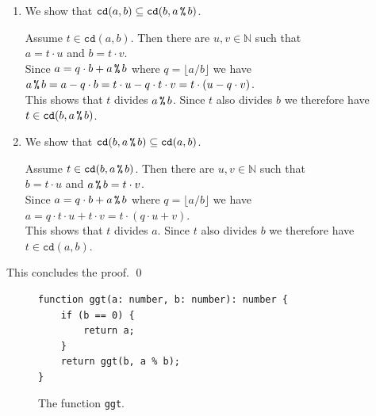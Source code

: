 \begin{enumerate}
\item We show that $\mathtt{cd}(a, b) \subseteq \mathtt{cd}(b, a \,\texttt{\%}\, b)$.

      Assume $t \in \mathtt{cd}(a, b)$.  Then there are $u, v \in \mathbb{N}$ such that
      \\[0.2cm]
      \hspace*{1.3cm}
      $a = t \cdot u$ \quad and \quad $b = t \cdot v$.
      \\[0.2cm]
      Since $a = q \cdot b + a \,\texttt{\%}\, b$ where $q = \lfloor a / b \rfloor$ we have
      \\[0.2cm]
      \hspace*{1.3cm}
      $a \,\texttt{\%}\, b = a - q \cdot b = t \cdot u - q \cdot t \cdot v = t \cdot (u - q \cdot v)$.
      \\[0.2cm]
      This shows that $t$ divides $a \,\texttt{\%}\, b$. Since $t$ also divides $b$ we therefore have
      $t \in \mathtt{cd}(b, a \,\texttt{\%}\, b)$. \green{$\surd$}
\item We show that $\mathtt{cd}(b, a \,\texttt{\%}\, b) \subseteq \mathtt{cd}(a, b)$.

      Assume $t \in \mathtt{cd}(b, a \,\texttt{\%}\, b)$.  Then there are $u, v \in \mathbb{N}$ such that
      \\[0.2cm]
      \hspace*{1.3cm}
      $b = t \cdot u$ \quad and \quad $a \,\texttt{\%}\, b = t \cdot v$.
      \\[0.2cm]
      Since $a = q \cdot b + a \,\texttt{\%}\, b$ where $q = \lfloor a / b \rfloor$ we have
      \\[0.2cm]
      \hspace*{1.3cm}
      $a = q \cdot t \cdot u + t \cdot v = t \cdot (q \cdot u + v)$.
      \\[0.2cm]
      This shows that $t$ divides $a$. Since $t$ also divides $b$ we therefore have
      $t \in \mathtt{cd}(a, b)$. \green{$\surd$}
\end{enumerate}
This concludes the proof. \qed

\begin{figure}[!h]
  \centering
\begin{verbatim}
function ggt(a: number, b: number): number {
    if (b == 0) {
        return a;
    }
    return ggt(b, a % b);
}
\end{verbatim}
\vspace*{-0.3cm}
  \caption{The function \texttt{ggt}.}
  \label{fig:gcd}
\end{figure}

